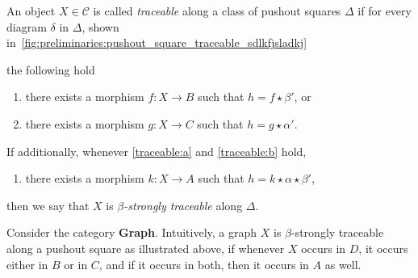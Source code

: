 \begin{definition}
    \label{def:traceability}
An object $X \in \mathcal{C}$ is called \emph{traceable} along a class of pushout squares $\Delta$ if for every diagram $\delta$ in $\Delta$, shown in~\autoref{fig:preliminaries:pushout_square_traceable_sdlkfjsladkj}
\begin{figure}
    \centering
    \caption{}
    \label{fig:preliminaries:pushout_square_traceable_sdlkfjsladkj}
\end{figure}
 the following hold
    \begin{enumerate}[label=(\alph*)]
        \item\label{traceable:a} there exists a morphism $f : X \to B$ such that $h = f \star \beta'$, or
        \item\label{traceable:b} there exists a morphism $g : X \to C$ such that $h = g \star \alpha'$.
    \end{enumerate}
    If additionally, 
    whenever \ref{traceable:a} and \ref {traceable:b} hold,
    \begin{enumerate}[label=(\alph*),resume]
        \item 
        there exists a morphism $k : X \to A$ such that $h = k \star \alpha \star \beta' $,
    \end{enumerate}
    then we say that $X$ is \emph{$\beta$-strongly traceable} along $\Delta$.
\end{definition}
Consider the category \textbf{Graph}. Intuitively, a graph $X$ is $\beta$-strongly traceable along a pushout square as illustrated above, if whenever $X$ occurs in $D$, it occurs either in $B$ or in $C$, and if it occurs in both, then it occurs in $A$ as well.

